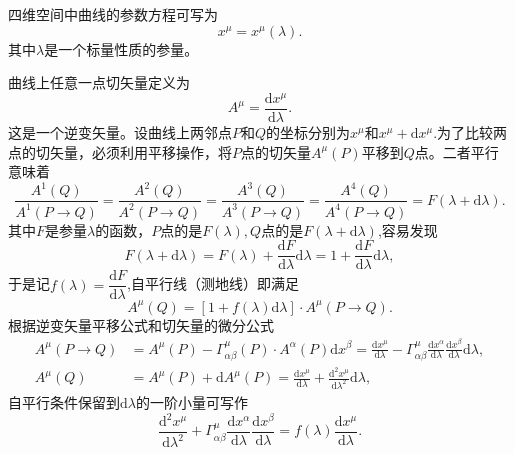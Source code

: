 \documentclass[11pt, a4paper, oneside, onecolumn]{ctexart}
\numberwithin{equation}{subsection}
\begin{document}
四维空间中曲线的参数方程可写为
\begin{equation}
x^{\mu}=x^{\mu}\left(\lambda\right).
\end{equation}
其中$\lambda$是一个标量性质的参量。

曲线上任意一点切矢量定义为
\begin{equation}
A^{\mu}=\frac{\mathrm{d}x^{\mu}}{\mathrm{d}\lambda}.
\end{equation}
这是一个逆变矢量。设曲线上两邻点$P$和$Q$的坐标分别为$x^{\mu}$和$x^{\mu}+\mathrm{d}x^{\mu}$.为了比较两点的切矢量，必须利用平移操作，将$P$点的切矢量$A^{\mu}\left(P\right)$平移到$Q$点。二者平行意味着
\begin{equation}
\frac{A^{1}\left(Q\right)}{A^{1}\left(P\to Q\right)}=\frac{A^{2}\left(Q\right)}{A^{2}\left(P\to Q\right)}=\frac{A^{3}\left(Q\right)}{A^{3}\left(P\to Q\right)}=\frac{A^{4}\left(Q\right)}{A^{4}\left(P\to Q\right)}=F\left(\lambda+\mathrm{d}\lambda\right).
\end{equation}
其中$F$是参量$\lambda$的函数，$P$点的是$F\left(\lambda\right),Q$点的是$F\left(\lambda+\mathrm{d}\lambda\right)$,容易发现
\begin{equation}
F\left(\lambda+\mathrm{d}\lambda\right)=F\left(\lambda\right)+\frac{\mathrm{d}F}{\mathrm{d}\lambda}\mathrm{d}\lambda=1+\frac{\mathrm{d}F}{\mathrm{d}\lambda}\mathrm{d}\lambda,
\end{equation}
于是记$f\left(\lambda\right)=\dfrac{\mathrm{d}F}{\mathrm{d}\lambda}$,自平行线（测地线）即满足
\begin{equation}
A^{\mu}\left(Q\right)=\left[1+f\left(\lambda\right)\mathrm{d}\lambda\right]\cdot A^{\mu}\left(P\to Q\right).
\end{equation}
根据逆变矢量平移公式和切矢量的微分公式
\begin{align}
A^{\mu}\left(P\to Q\right)&=A^{\mu}\left(P\right)-\Gamma_{\alpha\beta}^{\mu}\left(P\right)\cdot A^{\alpha}\left(P\right)\mathrm{d}x^{\beta}=\frac{\mathrm{d}x^{\mu}}{\mathrm{d}\lambda}-\Gamma_{\alpha\beta}^{\mu}\frac{\mathrm{d}x^{\alpha}}{\mathrm{d}\lambda}\frac{\mathrm{d}x^{\beta}}{\mathrm{d}\lambda}\mathrm{d}\lambda,\\
A^{\mu}\left(Q\right)&=A^{\mu}\left(P\right)+\mathrm{d}A^{\mu}\left(P\right)=\frac{\mathrm{d}x^{\mu}}{\mathrm{d}\lambda}+\frac{\mathrm{d}^{2}x^{\mu}}{\mathrm{d}\lambda^{2}}\mathrm{d}\lambda,
\end{align}
自平行条件保留到$\mathrm{d}\lambda$的一阶小量可写作
\begin{equation}
\frac{\mathrm{d}^{2}x^{\mu}}{\mathrm{d}\lambda^{2}}+\Gamma_{\alpha\beta}^{\mu}\frac{\mathrm{d}x^{\alpha}}{\mathrm{d}\lambda}\frac{\mathrm{d}x^{\beta}}{\mathrm{d}\lambda}=f\left(\lambda\right)\frac{\mathrm{d}x^{\mu}}{\mathrm{d}\lambda}.
\end{equation}
\end{document}
